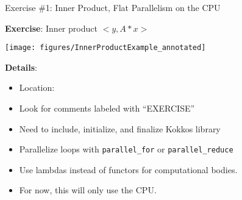 \begin{frame}[fragile]{Exercise \#1: Inner Product, Flat Parallelism on the CPU}

  \vspace{5pt}

  \textbf{Exercise}: Inner product $<y, A * x>$

  \vspace{-10pt}

  \begin{center}
    \texttt{[image: figures/InnerProductExample\_annotated]}
  \end{center}

  \vspace{-30pt}

  \textbf{Details}:
  \begin{small}
  \begin{itemize}
\item Location: 
\item Look for comments labeled with ``EXERCISE''
\item Need to include, initialize, and finalize Kokkos library
\item Parallelize loops with \texttt{parallel\_for} or \texttt{parallel\_reduce}
\item Use lambdas instead of functors for computational bodies.
\item For now, this will only use the CPU.
\end{itemize}
  \end{small}

\end{frame}


